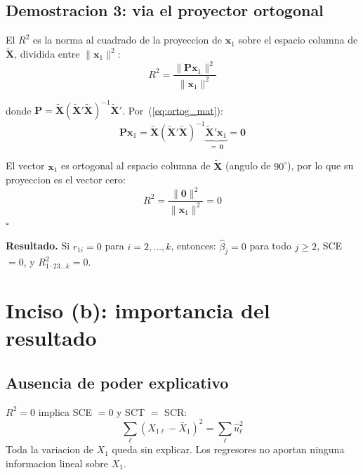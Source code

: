 \documentclass[12pt, letterpaper]{article}
\theoremstyle{remark}\newtheorem{obs}{Observacion}
\begin{document}
\subsection{Demostracion 3: via el proyector ortogonal}

El $R^2$ es la norma al cuadrado de la proyeccion de $\mathbf{x}_1$ sobre el espacio columna de $\tilde{\mathbf{X}}$, dividida entre $\|\mathbf{x}_1\|^2$:
\begin{equation}
  R^2 = \frac{\|\mathbf{P}\mathbf{x}_1\|^2}{\|\mathbf{x}_1\|^2}
\end{equation}

donde $\mathbf{P} = \tilde{\mathbf{X}}(\tilde{\mathbf{X}}'\tilde{\mathbf{X}})^{-1}\tilde{\mathbf{X}}'$.
Por~(\ref{eq:ortog_mat}):
\begin{equation}
  \mathbf{P}\mathbf{x}_1
    = \tilde{\mathbf{X}}(\tilde{\mathbf{X}}'\tilde{\mathbf{X}})^{-1}\underbrace{\tilde{\mathbf{X}}'\mathbf{x}_1}_{=\,\mathbf{0}}
    = \mathbf{0}
\end{equation}

El vector $\mathbf{x}_1$ es ortogonal al espacio columna de $\tilde{\mathbf{X}}$ (angulo de $90^\circ$),
por lo que su proyeccion es el vector cero:
\begin{equation}
  R^2 = \frac{\|\mathbf{0}\|^2}{\|\mathbf{x}_1\|^2} = 0
\end{equation}
\hfill $\square$

\begin{clave}
  \textbf{Resultado.} Si $r_{1i} = 0$ para $i = 2, \ldots, k$, entonces:
  $\hat\beta_j = 0$ para todo $j \geq 2$, SCE $= 0$, y $R^2_{1\cdot 23\ldots k} = 0$.
\end{clave}

\section{Inciso (b): importancia del resultado}

\subsection{Ausencia de poder explicativo}

$R^2 = 0$ implica SCE $= 0$ y SCT $=$ SCR:
\begin{equation}
  \sum_\ell (X_{1\ell} - \bar X_1)^2 = \sum_\ell \hat u_\ell^2
\end{equation}
Toda la variacion de $X_1$ queda sin explicar. Los regresores no aportan ninguna informacion lineal sobre $X_1$.
\end{document}
